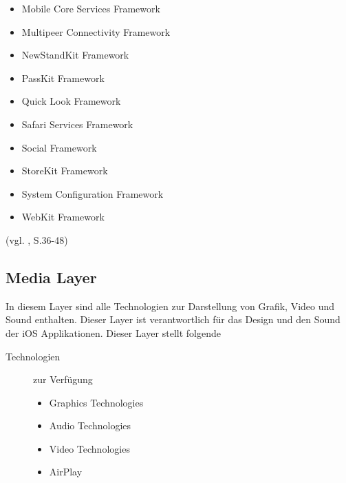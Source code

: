 \begin{description}
\begin{multicols}{2}
\begin{itemize}
		\item Mobile Core Services Framework
		\item Multipeer Connectivity Framework
		\item NewStandKit Framework
		\item PassKit Framework
		\item Quick Look Framework
		\item Safari Services Framework
		\item Social Framework
		\item StoreKit Framework
		\item System Configuration Framework
		\item WebKit Framework
	\end{itemize}
	\end{multicols}
\end{description}
(vgl. \cite{Apple[6]}, S.36-48)
\subsection{Media Layer}
\label{sec:MediaLayer}		
In diesem Layer sind alle Technologien zur Darstellung von Grafik, Video und
Sound enthalten. Dieser Layer ist verantwortlich für das Design und den Sound
der iOS Applikationen.
Dieser Layer stellt folgende
\begin{description}
	\item[\glqq Technologien\grqq{}]zur Verfügung~\par
	\begin{itemize}
		\item Graphics Technologies
		\item Audio Technologies
		\item Video Technologies
		\item AirPlay
	\end{itemize}
\end{description}

